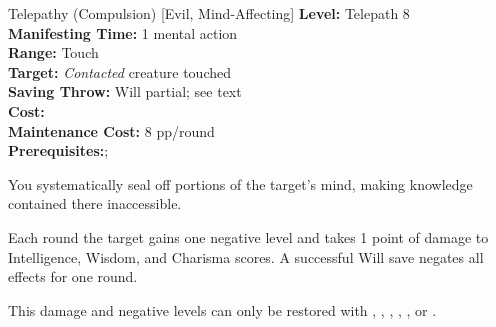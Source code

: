 {Telepathy (Compulsion) [Evil, Mind-Affecting]}
{
	\textbf{Level:}
	Telepath 8\\
	\textbf{Manifesting Time:}
	1 mental action\\
	\textbf{Range:}
	Touch\\
	\textbf{Target:}
	\emph{Contacted} creature touched\\
	\textbf{Saving Throw:}
	Will partial; see text\\
	\textbf{Cost:}
	\\
	\textbf{Maintenance Cost:}
	8 pp/round\\
	\textbf{Prerequisites:};
	\\
}
{
	You systematically seal off portions of the target's mind, making knowledge contained there inaccessible.

	Each round the target gains one negative level and takes 1 point of damage to Intelligence, Wisdom, and Charisma scores. A successful Will save negates all effects for one round.

	This damage and negative levels can only be restored with , , , , , or . 
}
